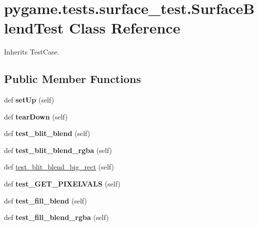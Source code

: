 \hypertarget{classpygame_1_1tests_1_1surface__test_1_1_surface_blend_test}{}\section{pygame.\+tests.\+surface\+\_\+test.\+Surface\+Blend\+Test Class Reference}
\label{classpygame_1_1tests_1_1surface__test_1_1_surface_blend_test}


Inherits Test\+Case.

\subsection*{Public Member Functions}
\begin{DoxyCompactItemize}
\item 
\mbox{\label{classpygame_1_1tests_1_1surface__test_1_1_surface_blend_test_a22ba0d41c931484edae3ae67d61f5874}} 
def {\bfseries set\+Up} (self)
\item 
\mbox{\label{classpygame_1_1tests_1_1surface__test_1_1_surface_blend_test_afdcfa5e2078d2e0c36b0ad21c87d8f2e}} 
def {\bfseries tear\+Down} (self)
\item 
\mbox{\label{classpygame_1_1tests_1_1surface__test_1_1_surface_blend_test_a071186f0f1c29e59ba7c64985e44ad34}} 
def {\bfseries test\+\_\+blit\+\_\+blend} (self)
\item 
\mbox{\label{classpygame_1_1tests_1_1surface__test_1_1_surface_blend_test_aebf477269511f010f8dc217196f03af1}} 
def {\bfseries test\+\_\+blit\+\_\+blend\+\_\+rgba} (self)
\item 
def \hyperlink{classpygame_1_1tests_1_1surface__test_1_1_surface_blend_test_aa3944e83dda81a31d43ea556ac93a3f9}{test\+\_\+blit\+\_\+blend\+\_\+big\+\_\+rect} (self)
\item 
\mbox{\label{classpygame_1_1tests_1_1surface__test_1_1_surface_blend_test_a25a1cd69162fcb5b5e4888c6bb367e7c}} 
def {\bfseries test\+\_\+\+G\+E\+T\+\_\+\+P\+I\+X\+E\+L\+V\+A\+LS} (self)
\item 
\mbox{\label{classpygame_1_1tests_1_1surface__test_1_1_surface_blend_test_a5abee999f53cc69e4b527ecc96ec86f9}} 
def {\bfseries test\+\_\+fill\+\_\+blend} (self)
\item 
\mbox{\label{classpygame_1_1tests_1_1surface__test_1_1_surface_blend_test_ae3204e7c28f6af5380c7d88eb8618d4d}} 
def {\bfseries test\+\_\+fill\+\_\+blend\+\_\+rgba} (self)
\end{DoxyCompactItemize}
